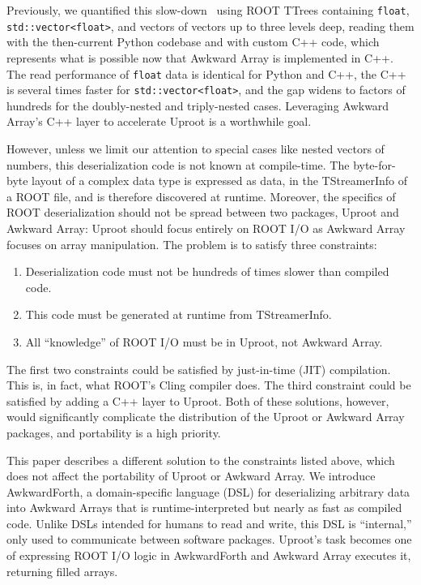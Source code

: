 \documentclass{webofc}
\begin{document}
Previously, we quantified this slow-down~\cite{chep2019} using ROOT TTrees containing \texttt{float}, \texttt{std::vector<float>}, and vectors of vectors up to three levels deep, reading them with the then-current Python codebase and with custom C++ code, which represents what is possible now that Awkward Array is implemented in C++. The read performance of \texttt{float} data is identical for Python and C++, the C++ is several times faster for \texttt{std::vector<float>}, and the gap widens to factors of hundreds for the doubly-nested and triply-nested cases. Leveraging Awkward Array's C++ layer to accelerate Uproot is a worthwhile goal.

However, unless we limit our attention to special cases like nested vectors of numbers, this deserialization code is not known at compile-time. The byte-for-byte layout of a complex data type is expressed as data, in the TStreamerInfo of a ROOT file, and is therefore discovered at runtime. Moreover, the specifics of ROOT deserialization should not be spread between two packages, Uproot and Awkward Array: Uproot should focus entirely on ROOT I/O as Awkward Array focuses on array manipulation. The problem is to satisfy three constraints:
\begin{enumerate}
\item Deserialization code must not be hundreds of times slower than compiled code.
\item This code must be generated at runtime from TStreamerInfo.
\item All ``knowledge'' of ROOT I/O must be in Uproot, not Awkward Array.
\end{enumerate}

The first two constraints could be satisfied by just-in-time (JIT) compilation. This is, in fact, what ROOT's Cling compiler does. The third constraint could be satisfied by adding a C++ layer to Uproot. Both of these solutions, however, would significantly complicate the distribution of the Uproot or Awkward Array packages, and portability is a high priority.

This paper describes a different solution to the constraints listed above, which does not affect the portability of Uproot or Awkward Array. We introduce AwkwardForth, a domain-specific language (DSL) for deserializing arbitrary data into Awkward Arrays that is runtime-interpreted but nearly as fast as compiled code. Unlike DSLs intended for humans to read and write, this DSL is ``internal,'' only used to communicate between software packages. Uproot's task becomes one of expressing ROOT I/O logic in AwkwardForth and Awkward Array executes it, returning filled arrays.
\end{document}
